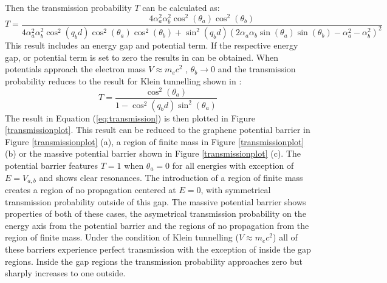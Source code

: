 \documentclass[12pt,a4paper]{report}
\begin{document}
				Then the transmission probability $T$ can be calculated as:
				\begin{equation}
					T=\frac{4\alpha_{a}^{2}\alpha_{b}^{2}\cos^{2}(\theta_{a})\cos^{2}(\theta_{b})}{4\alpha_{a}^{2}\alpha_{b}^{2}\cos^{2}(q_{b}d)\cos^{2}(\theta_{a})\cos^{2}(\theta_{b})+\sin^{2}(q_{b}d)\left(2\alpha_{a}\alpha_{b}\sin(\theta_{a})\sin(\theta_{b})-\alpha_{a}^{2}-\alpha_{b}^{2}\right)^{2}}
					\label{eq:transmission}
				\end{equation}
				This result includes an energy gap and potential term. If the respective energy gap, or potential term is set to zero the results in \cite{b1} can be obtained. When potentials approach the electron mass $V \approx m_{e}c^{2}$ \cite{b49}, $\theta_{b}\rightarrow 0$ and the transmission probability reduces to the result for Klein tunnelling shown in \cite{b12}:
				\begin{equation}
					T=\frac{\cos^{2}(\theta_{a})}{1-\cos^{2}(q_{b}d)\sin^{2}(\theta_{a})}
					\label{t2}
				\end{equation}
				The result in Equation (\ref{eq:transmission}) is then plotted in Figure \ref{transmissionplot}. This result can be reduced to the graphene potential barrier in Figure \ref{transmissionplot} (a), a region of finite mass in Figure \ref{transmissionplot} (b) or the massive potential barrier shown in Figure \ref{transmissionplot} (c). The potential barrier features $T=1$ when $\theta_{a}=0$ for all energies with exception of $E=V_{a,b}$ and shows clear resonances. The introduction of a region of finite mass creates a region of no propagation centered at $E=0$, with symmetrical transmission probability outside of this gap. The massive potential barrier shows properties of both of these cases, the asymetrical transmission probability on the energy axis from the potential barrier and the regions of no propagation from the region of finite mass. Under the condition of Klein tunnelling ($V\approx m_{e}c^{2}$) all of these barriers experience perfect transmission with the exception of inside the gap regions. Inside the gap regions the transmission probability approaches zero but sharply increases to one outside.
\end{document}
